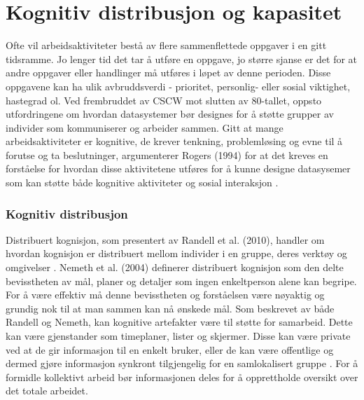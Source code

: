 \section{Kognitiv distribusjon og kapasitet}
\label{chp: kognisjon}
Ofte vil arbeidsaktiviteter bestå av flere sammenflettede oppgaver i en gitt tidsramme. Jo lenger tid det tar å utføre en oppgave, jo større sjanse er det for at andre oppgaver eller handlinger må utføres i løpet av denne perioden. Disse oppgavene kan ha ulik avbruddsverdi - prioritet, personlig- eller sosial viktighet, hastegrad ol. 
Ved frembruddet av CSCW mot slutten av 80-tallet, oppsto utfordringene om hvordan datasystemer bør designes for å støtte grupper av individer som kommuniserer og arbeider sammen. Gitt at mange arbeidsaktiviteter er kognitive, de krever tenkning, problemløsing og evne til å forutse og ta beslutninger, argumenterer Rogers (1994) for at det kreves en forståelse for hvordan disse aktivitetene utføres for å kunne designe datasysemer som kan støtte både kognitive aktiviteter og sosial interaksjon \cite{Rogers94}.

\subsubsection{Kognitiv distribusjon}
Distribuert kognisjon, som presentert av Randell et al. (2010), handler om hvordan kognisjon er distribuert mellom individer i en gruppe, deres verktøy og omgivelser \cite{Randell}. Nemeth et al. (2004) definerer distribuert kognisjon som den delte bevisstheten av mål, planer og detaljer som ingen enkeltperson alene kan begripe. For å være effektiv må denne bevisstheten og forståelsen være nøyaktig og grundig nok til at man sammen kan nå ønskede mål. Som beskrevet av både Randell og Nemeth, kan kognitive artefakter være til støtte for samarbeid. Dette kan være gjenstander som timeplaner, lister og skjermer. Disse kan være private ved at de gir informasjon til en enkelt bruker, eller de kan være offentlige og dermed gjøre informasjon synkront tilgjengelig for en samlokalisert gruppe \cite{Randell, Nemeth04}. For å formidle kollektivt arbeid bør informasjonen deles for å opprettholde oversikt over det totale arbeidet.

